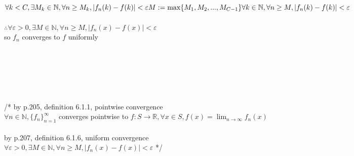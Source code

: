 \documentclass[12pt, border = 4pt, multi]{article} %
\begin{document}
\\
$\forall k < C, \exists M_k \in \mathbb{N}, \forall n \geq M_k, |f_n(k) - f(k)| < \varepsilon\\
M := \max\{M_1, M_2, ..., M_{C - 1}\}\\
\forall k \in \mathbb{N}, \forall n \geq M, |f_n(k) - f(k)| < \varepsilon$\\
\\
$\therefore \forall \varepsilon > 0, \exists M \in \mathbb{N}, \forall n \geq M, |f_n(x) - f(x)| < \varepsilon$\\
so $f_n$ converges to $f$ uniformly\\
\\
\\
\\
\\
\\
\\
/* by p.205, definition 6.1.1, pointwise convergence\\
$\forall n \in \mathbb{N}, \{f_n\}_{n = 1} ^ {\infty}$ converges pointwise to $f: S \rightarrow \mathbb{R}, \forall x \in S, f(x) = \lim_{n \rightarrow \infty} f_n(x)$\\
\\
by p.207, definition 6.1.6, uniform convergence\\
$\forall \varepsilon > 0, \exists M \in \mathbb{N}, \forall n \geq M, |f_n(x) - f(x)| < \varepsilon$ */\\
\end{document}
